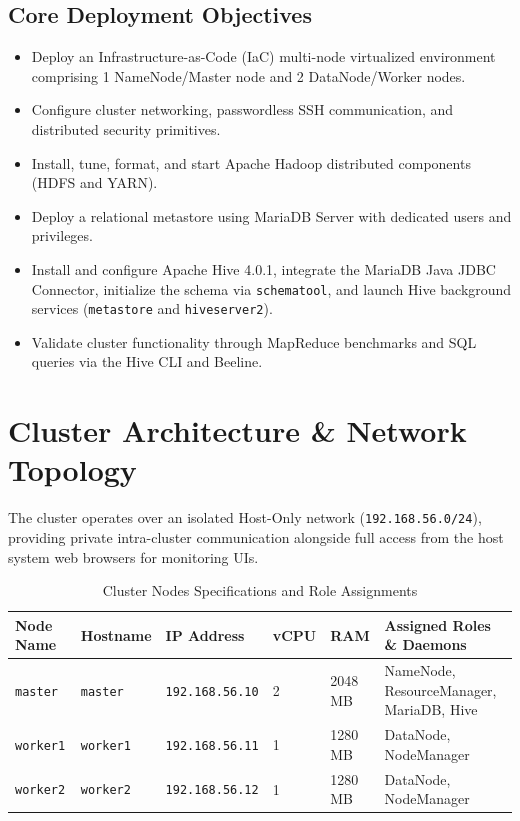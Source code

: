 \documentclass[11pt,a4paper]{article}
\begin{document}
\subsection{Core Deployment Objectives}
\begin{itemize}[leftmargin=1.5cm]
    \item Deploy an Infrastructure-as-Code (IaC) multi-node virtualized environment comprising 1 NameNode/Master node and 2 DataNode/Worker nodes.
    \item Configure cluster networking, passwordless SSH communication, and distributed security primitives.
    \item Install, tune, format, and start Apache Hadoop distributed components (HDFS and YARN).
    \item Deploy a relational metastore using MariaDB Server with dedicated users and privileges.
    \item Install and configure Apache Hive 4.0.1, integrate the MariaDB Java JDBC Connector, initialize the schema via \texttt{schematool}, and launch Hive background services (\texttt{metastore} and \texttt{hiveserver2}).
    \item Validate cluster functionality through MapReduce benchmarks and SQL queries via the Hive CLI and Beeline.
\end{itemize}

\section{Cluster Architecture \& Network Topology}
The cluster operates over an isolated Host-Only network (\texttt{192.168.56.0/24}), providing private intra-cluster communication alongside full access from the host system web browsers for monitoring UIs.

\begin{table}[h!]
\centering
\caption{Cluster Nodes Specifications and Role Assignments}
\begin{tabular}{@{}llllll@{}}
\toprule
\textbf{Node Name} & \textbf{Hostname} & \textbf{IP Address} & \textbf{vCPU} & \textbf{RAM} & \textbf{Assigned Roles \& Daemons} \\ \midrule
\texttt{master} & \texttt{master} & \texttt{192.168.56.10} & 2 & 2048 MB & NameNode, ResourceManager, MariaDB, Hive \\
\texttt{worker1} & \texttt{worker1} & \texttt{192.168.56.11} & 1 & 1280 MB & DataNode, NodeManager \\
\texttt{worker2} & \texttt{worker2} & \texttt{192.168.56.12} & 1 & 1280 MB & DataNode, NodeManager \\ \bottomrule
\end{tabular}
\end{table}
\end{document}
